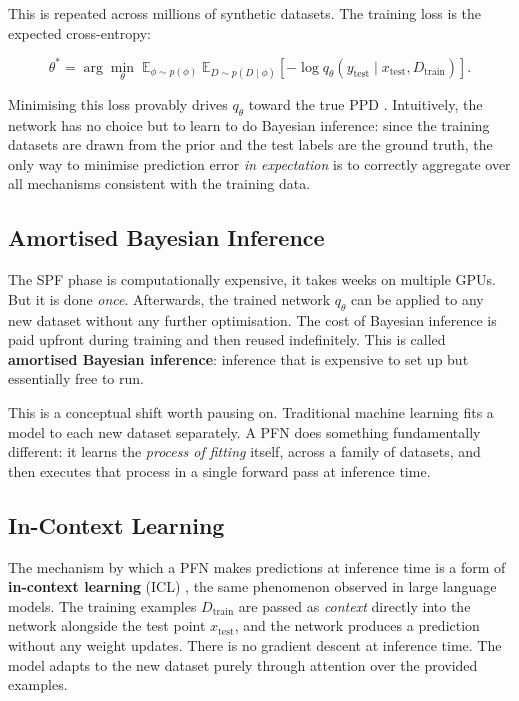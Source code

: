\documentclass[12pt]{article}
\begin{document}
This is repeated across millions of synthetic datasets. The training loss is the expected cross-entropy:

\[
\theta^* = \arg\min_\theta\; \mathbb{E}_{\phi \sim p(\phi)}\; \mathbb{E}_{D \sim p(D \mid \phi)} \left[ -\log q_\theta(y_{\text{test}} \mid x_{\text{test}}, D_{\text{train}}) \right].
\]

Minimising this loss provably drives $q_\theta$ toward the true PPD \cite{muller2022transformers}. Intuitively, the network has no choice but to learn to do Bayesian inference: since the training datasets are drawn from the prior and the test labels are the ground truth, the only way to minimise prediction error \emph{in expectation} is to correctly aggregate over all mechanisms consistent with the training data.

\subsection{Amortised Bayesian Inference}

The SPF phase is computationally expensive,  it takes weeks on multiple GPUs. But it is done \emph{once}. Afterwards, the trained network $q_\theta$ can be applied to any new dataset without any further optimisation. The cost of Bayesian inference is paid upfront during training and then reused indefinitely. This is called \textbf{amortised Bayesian inference}: inference that is expensive to set up but essentially free to run.

This is a conceptual shift worth pausing on. Traditional machine learning fits a model to each new dataset separately. A PFN does something fundamentally different: it learns the \emph{process of fitting} itself, across a family of datasets, and then executes that process in a single forward pass at inference time.

\subsection{In-Context Learning}

The mechanism by which a PFN makes predictions at inference time is a form of \textbf{in-context learning} (ICL) \cite{brown2020language},  the same phenomenon observed in large language models. The training examples $D_{\text{train}}$ are passed as \emph{context} directly into the network alongside the test point $x_{\text{test}}$, and the network produces a prediction without any weight updates. There is no gradient descent at inference time. The model adapts to the new dataset purely through attention over the provided examples.
\end{document}
